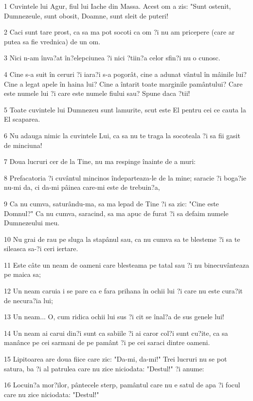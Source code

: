 \par 1 Cuvintele lui Agur, fiul lui Iache din Massa. Acest om a zis: "Sunt ostenit, Dumnezeule, sunt obosit, Doamne, sunt sleit de puteri!
\par 2 Caci sunt tare prost, ca sa ma pot socoti ca om ?i nu am pricepere (care ar putea sa fie vrednica) de un om.
\par 3 Nici n-am înva?at în?elepciunea ?i nici ?tiin?a celor sfin?i nu o cunosc.
\par 4 Cine s-a suit în ceruri ?i iara?i s-a pogorât, cine a adunat vântul în mâinile lui? Cine a legat apele în haina lui? Cine a întarit toate marginile pamântului? Care este numele lui ?i care este numele fiului sau? Spune daca ?tii!
\par 5 Toate cuvintele lui Dumnezeu sunt lamurite, scut este El pentru cei ce cauta la El scaparea.
\par 6 Nu adauga nimic la cuvintele Lui, ca sa nu te traga la socoteala ?i sa fii gasit de minciuna!
\par 7 Doua lucruri cer de la Tine, nu ma respinge înainte de a muri:
\par 8 Prefacatoria ?i cuvântul mincinos îndeparteaza-le de la mine; saracie ?i boga?ie nu-mi da, ci da-mi pâinea care-mi este de trebuin?a,
\par 9 Ca nu cumva, saturându-ma, sa ma lepad de Tine ?i sa zic: "Cine este Domnul?" Ca nu cumva, saracind, sa ma apuc de furat ?i sa defaim numele Dumnezeului meu.
\par 10 Nu grai de rau pe sluga la stapânul sau, ca nu cumva sa te blesteme ?i sa te sileasca sa-?i ceri iertare.
\par 11 Este câte un neam de oameni care blesteama pe tatal sau ?i nu binecuvânteaza pe maica sa;
\par 12 Un neam caruia i se pare ca e fara prihana în ochii lui ?i care nu este cura?it de necura?ia lui;
\par 13 Un neam... O, cum ridica ochii lui sus ?i cit se înal?a de sus genele lui!
\par 14 Un neam ai carui din?i sunt ca sabiile ?i ai caror col?i sunt cu?ite, ca sa manânce pe cei sarmani de pe pamânt ?i pe cei saraci dintre oameni.
\par 15 Lipitoarea are doua fiice care zic: "Da-mi, da-mi!" Trei lucruri nu se pot satura, ba ?i al patrulea care nu zice niciodata: "Destul!" ?i anume:
\par 16 Locuin?a mor?ilor, pântecele sterp, pamântul care nu e satul de apa ?i focul care nu zice niciodata: "Destul!"
